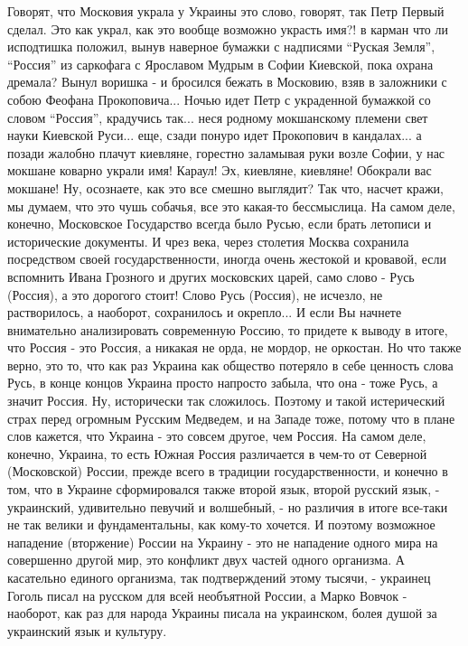 Говорят, что Московия украла у Украины это слово, говорят, так Петр Первый
сделал. Это как украл, как это вообще возможно украсть имя?! в карман что ли
исподтишка положил, вынув наверное бумажки с надписями  \enquote{Руская Земля},
\enquote{Россия} из саркофага с Ярославом Мудрым в Софии Киевской, пока охрана
дремала? Вынул воришка - и бросился бежать в Московию, взяв в заложники с собою
Феофана Прокоповича... Ночью идет Петр с украденной бумажкой со словом
\enquote{Россия}, крадучись так... неся родному мокшанскому племени свет науки
Киевской Руси... еще, сзади понуро идет Прокопович в кандалах... а позади
жалобно плачут киевляне, горестно заламывая руки возле Софии, у нас мокшане
коварно украли имя! Караул! Эх, киевляне, киевляне! Обокрали вас мокшане! Ну,
осознаете, как это все смешно выглядит?  Так что, насчет кражи, мы думаем, что
это чушь собачья, все это какая-то бессмыслица. На самом деле, конечно,
Московское Государство всегда было Русью, если брать летописи и исторические
документы. И чрез века, через столетия Москва сохранила посредством своей
государственности, иногда очень жестокой и кровавой, если вспомнить Ивана
Грозного и других московских царей, само слово - Русь (Россия), а это дорогого
стоит! Слово Русь (Россия), не исчезло, не растворилось, а наоборот,
сохранилось и окрепло... И если Вы начнете внимательно анализировать
современную Россию, то придете к выводу в итоге, что Россия - это Россия, а
никакая не орда, не мордор, не оркостан. Но что также верно, это то, что как
раз Украина как общество потеряло в себе ценность слова Русь, в конце концов
Украина просто напросто забыла, что она - тоже Русь, а значит Россия. Ну,
исторически так сложилось. Поэтому и такой истерический страх перед огромным
Русским Медведем, и на Западе тоже, потому что в плане слов кажется, что
Украина - это совсем другое, чем Россия. На самом деле, конечно, Украина, то
есть Южная Россия различается в чем-то от Северной (Московской) России, прежде
всего в традиции государственности, и конечно в том, что в Украине
сформировался также второй язык, второй русский язык, - украинский, удивительно
певучий и волшебный, - но различия в итоге все-таки не так велики и
фундаментальны, как кому-то хочется.  И поэтому возможное нападение (вторжение)
России на Украину - это не нападение одного мира на совершенно другой мир, это
конфликт двух частей одного организма. А касательно единого организма, так
подтверждений этому тысячи, - украинец Гоголь писал на русском для всей
необъятной России, а Марко Вовчок - наоборот, как раз для народа Украины писала
на украинском, болея душой за украинский язык и культуру.

